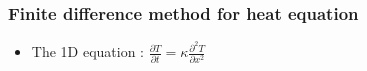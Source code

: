 \begin{frame}[fragile]
\frametitle{Finite difference method for heat equation}
\newcommand{\newfilename}{py-precise-loop.py}
\begin{itemize}
\item The 1D equation : $\frac{\partial T}{\partial t} = \kappa \frac{\partial^2 T}{\partial x^2}$

\end{itemize}
\end{frame}
